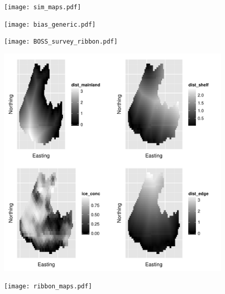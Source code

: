\documentclass[12pt,english]{article}
\begin{document}
\begin{spacing}{1.9}
\begin{figure}[!h]
\begin{center}
\texttt{[image: sim\_maps.pdf]}
\end{center}
\caption{ }
\label{fig:sim_maps}
\end{figure}

\begin{figure}[!h]
\begin{center}
\texttt{[image: bias\_generic.pdf]}
\end{center}
\caption{ }
\label{fig:sim_boxplots}
\end{figure}

\begin{figure}[!h]
\begin{center}
\texttt{[image: BOSS\_survey\_ribbon.pdf]}
\end{center}
\caption{ }
\label{fig:flights}
\end{figure}

\begin{figure}[!h]
\begin{center}
\includegraphics[width=6in]{covariates.pdf}
\end{center}
\caption{ }
\label{fig:covs}
\end{figure}

\begin{figure}[!h]
\begin{center}
\texttt{[image: ribbon\_maps.pdf]}
\end{center}
\caption{ }
\label{fig:ribbon_plot}
\end{figure}



\clearpage

\end{spacing}
\end{document}
